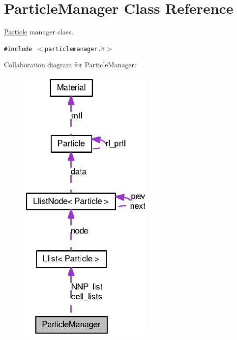 \hypertarget{classParticleManager}{
\section{ParticleManager Class Reference}
\label{classParticleManager}
}
\hyperlink{classParticle}{Particle} manager class.  


{\tt \#include $<$particlemanager.h$>$}

Collaboration diagram for ParticleManager:\nopagebreak
\begin{figure}[H]
\begin{center}
\leavevmode
\includegraphics[width=189pt]{classParticleManager__coll__graph}
\end{center}
\end{figure}
